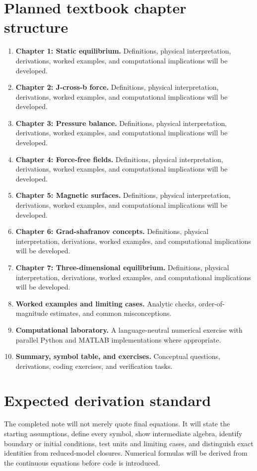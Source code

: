 \documentclass[11pt]{article}
\begin{document}
\section{Planned textbook chapter structure}
\begin{enumerate}[leftmargin=1.8em]
\item \textbf{Chapter 1: Static equilibrium.} Definitions, physical interpretation, derivations, worked examples, and computational implications will be developed.
\item \textbf{Chapter 2: J-cross-b force.} Definitions, physical interpretation, derivations, worked examples, and computational implications will be developed.
\item \textbf{Chapter 3: Pressure balance.} Definitions, physical interpretation, derivations, worked examples, and computational implications will be developed.
\item \textbf{Chapter 4: Force-free fields.} Definitions, physical interpretation, derivations, worked examples, and computational implications will be developed.
\item \textbf{Chapter 5: Magnetic surfaces.} Definitions, physical interpretation, derivations, worked examples, and computational implications will be developed.
\item \textbf{Chapter 6: Grad-shafranov concepts.} Definitions, physical interpretation, derivations, worked examples, and computational implications will be developed.
\item \textbf{Chapter 7: Three-dimensional equilibrium.} Definitions, physical interpretation, derivations, worked examples, and computational implications will be developed.
\item \textbf{Worked examples and limiting cases.} Analytic checks, order-of-magnitude estimates, and common misconceptions.
\item \textbf{Computational laboratory.} A language-neutral numerical exercise with parallel Python and MATLAB implementations where appropriate.
\item \textbf{Summary, symbol table, and exercises.} Conceptual questions, derivations, coding exercises, and verification tasks.
\end{enumerate}

\section{Expected derivation standard}
The completed note will not merely quote final equations. It will state the starting assumptions, define every symbol, show intermediate algebra, identify boundary or initial conditions, test units and limiting cases, and distinguish exact identities from reduced-model closures. Numerical formulas will be derived from the continuous equations before code is introduced.
\end{document}
